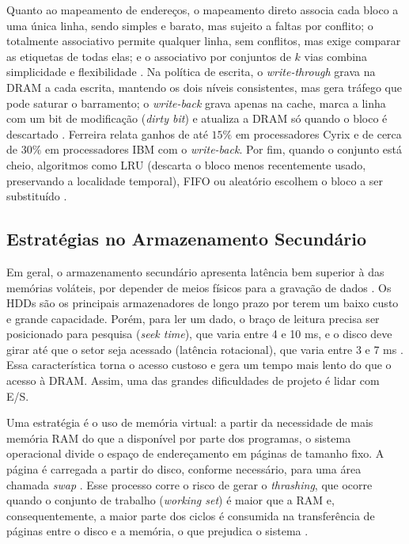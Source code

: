 \documentclass[12pt]{article}
\begin{document}
Quanto ao mapeamento de endereços, o mapeamento direto associa cada bloco a uma única linha, sendo simples e barato, mas sujeito a faltas por conflito; o totalmente associativo permite qualquer linha, sem conflitos, mas exige comparar as etiquetas de todas elas; e o associativo por conjuntos de $k$ vias combina simplicidade e flexibilidade \cite{stallings2010}. Na política de escrita, o \textit{write-through} grava na DRAM a cada escrita, mantendo os dois níveis consistentes, mas gera tráfego que pode saturar o barramento; o \textit{write-back} grava apenas na cache, marca a linha com um bit de modificação (\textit{dirty bit}) e atualiza a DRAM só quando o bloco é descartado \cite{stallings2010}. Ferreira \cite{ferreira2015} relata ganhos de até $15\%$ em processadores Cyrix e de cerca de $30\%$ em processadores IBM com o \textit{write-back}. Por fim, quando o conjunto está cheio, algoritmos como LRU (descarta o bloco menos recentemente usado, preservando a localidade temporal), FIFO ou aleatório escolhem o bloco a ser substituído \cite{stallings2010}.

\subsection{Estratégias no Armazenamento Secundário} 
\label{sec:secundario}
Em geral, o armazenamento secundário apresenta latência bem superior à das memórias voláteis, por depender de meios físicos para a gravação de dados \cite{oliveira2019, stallings2010}. Os HDDs são os principais armazenadores de longo prazo por terem um baixo custo e grande capacidade. Porém, para ler um dado, o braço de leitura precisa ser posicionado para pesquisa (\textit{seek time}), que varia entre 4 e 10 ms, e o disco deve girar até que o setor seja acessado (latência rotacional), que varia entre 3 e 7 ms \cite{santos2015}. Essa característica torna o acesso custoso e gera um tempo mais lento do que o acesso à DRAM. Assim, uma das grandes dificuldades de projeto é lidar com E/S.

Uma estratégia é o uso de memória virtual: a partir da necessidade de mais memória RAM do que a disponível por parte dos programas, o sistema operacional divide o espaço de endereçamento em páginas de tamanho fixo. A página é carregada a partir do disco, conforme necessário, para uma área chamada \textit{swap} \cite{souza2023}. Esse processo corre o risco de gerar o \textit{thrashing}, que ocorre quando o conjunto de trabalho (\textit{working set}) é maior que a RAM e, consequentemente, a maior parte dos ciclos é consumida na transferência de páginas entre o disco e a memória, o que prejudica o sistema \cite{souza2023}. 
\end{document}
